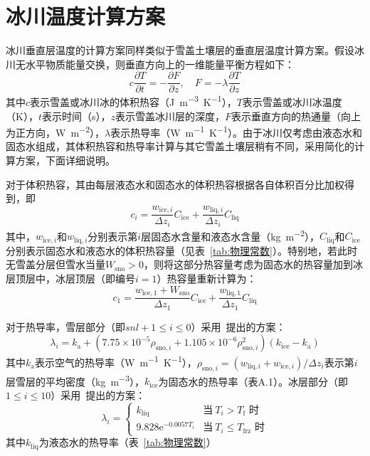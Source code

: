 \section{冰川温度计算方案}
冰川垂直层温度的计算方案同样类似于雪盖土壤层的垂直层温度计算方案。假设冰川无水平物质能量交换，则垂直方向上的一维能量平衡方程如下：
\begin{equation}\label{eq:GlacierThermalCons}
  c \frac{\partial T}{\partial t}=-\frac{\partial F}{\partial z},  \quad F=-\lambda \frac{\partial T}{\partial z}
\end{equation}
其中$c$表示雪盖或冰川冰的体积热容（\unit{J.m^{-3}.K^{-1}}），$T$表示雪盖或冰川冰温度（K），$t$表示时间（s），$z$表示雪盖冰川层的深度，$F$表示垂直方向的热通量（向上为正方向，\unit{W.m^{-2}}），$\lambda$表示热导率（\unit{W.m^{-1}.K^{-1}}）。由于冰川仅考虑由液态水和固态水组成，其体积热容和热导率计算与其它雪盖土壤层稍有不同，采用简化的计算方案，下面详细说明。

对于体积热容，其由每层液态水和固态水的体积热容根据各自体积百分比加权得到，即
\begin{equation}
  c_i = \frac{w_{\mathrm{ice},i}}{\Delta z_i}C_{\mathrm{ice}} + \frac{w_{\mathrm{liq},i}}{\Delta z_i}C_{\mathrm{liq}}
\end{equation}
其中，$w_{\mathrm{ice},i}$和$w_{\mathrm{liq},i}$分别表示第$i$层固态水含量和液态水含量（\unit{kg.m^{-2}}），$C_{\mathrm{liq}}$和$C_{\mathrm{ice}}$分别表示固态水和液态水的体积热容量（见表~\ref{tab:物理常数}）。特别地，若此时无雪盖分层但雪水当量$W_{\mathrm{sno}}>0$，则将这部分热容量考虑为固态水的热容量加到冰层顶层中，冰层顶层（即编号$i=1$）热容量重新计算为：
\begin{equation}
  c_1 = \frac{w_{\mathrm{ice,1}}+W_{\mathrm{sno}}}{\Delta z_1}C_{\mathrm{ice}} + \frac{w_{\mathrm{liq,1}}}{\Delta z_1}C_{\mathrm{liq}}
\end{equation}

对于热导率，雪层部分（即$snl+1\leqslant i\leqslant 0$）采用~\citet{jordan1991one}提出的方案：
\begin{equation}
  \lambda_i = k_{\mathrm {a}}  + \left(7.75 \times 10^{-5} \rho_{\mathrm{sno},i} + 1.105\times 10^{-6} \rho^2_{\mathrm{sno},i}\right)\left(k_{\mathrm {ice}}-k_{\mathrm {a}} \right)
\end{equation}
其中$k_{\mathrm {a}} $表示空气的热导率（\unit{W.m^{-1}.K^{-1}}），$\rho_{\mathrm{sno},i}=\left(w_{\mathrm{liq},i}+w_{\mathrm{ice},i}\right)/\Delta z_i$表示第$i$层雪层的平均密度（\unit{kg.m^{-3}}），$k_{\mathrm {ice}}$为固态水的热导率（表A.1）。冰层部分（即$1\leqslant i \leqslant 10$）采用~\citet{yen1981review}提出的方案：
\begin{equation}
  \lambda_i =\begin{cases}
    k_{\mathrm {liq}} &\text{当}\ T_i > T_{\mathrm f} \text{ 时} \\
    9.828 {\mathrm e}^{-0.0057 T_i} &\text{当}\ T_i \leqslant T_{\mathrm {frz}}  \text{ 时}
  \end{cases}
\end{equation}
其中$k_{\mathrm {liq}}$为液态水的热导率（表~\ref{tab:物理常数}）

